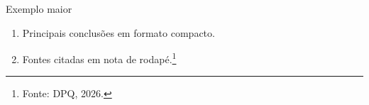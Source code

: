 \documentclass[a4paper, 11pt]{DPQISTfactsheet}
\begin{document}
\begin{istcaixa}{\faBalanceScale}{Exemplo maior}
\begin{enumerate}[label=\alph*), leftmargin=*]
    \item Principais conclusões em formato compacto.
    \item Fontes citadas em nota de rodapé.\footnote{Fonte: DPQ, 2026.}
\end{enumerate}
\end{istcaixa}

\end{document}
